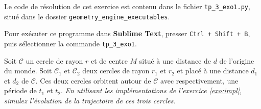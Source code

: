 \documentclass[a4paper,12pt]{article}
\begin{document}
Le code de résolution de cet exercice est contenu dans le fichier \texttt{tp\_3\_exo1.py}, situé dans le dossier \texttt{geometry\_engine\_executables}.

Pour exécuter ce programme dans \textbf{Sublime Text}, presser \texttt{Ctrl + Shift + B}, puis sélectionner la commande \texttt{tp\_3\_exo1}.

\newpage


Soit $\mathcal{C}$ un cercle de rayon $r$ et de centre $M$ situé à une distance de $d$ de l'origine du monde. Soit $\mathcal{C}_1$ et $\mathcal{C}_2$ deux cercles de rayon $r_1$ et $r_2$ et placé à une distance $d_1$ et $d_2$ de $\mathcal{C}$. Ces deux cercles orbitent autour de $\mathcal{C}$ avec respectivement, une période de $t_1$ et $t_2$.\newline \newline
\emph{En utilisant les implémentations de l'exercice \ref{exo:impl}, simulez l'évolution de la trajectoire de ces trois cercles.}
\end{document}
